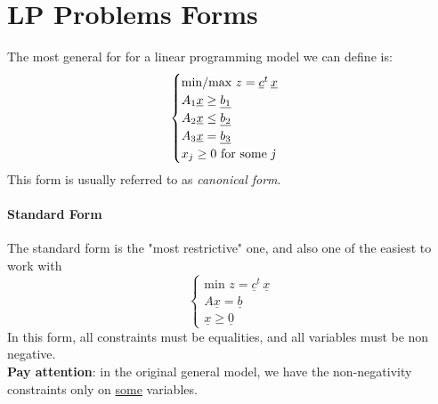     \section{LP Problems Forms}
        The most general for for a linear programming model we can define is:
        \begin{equation}
            \begin{cases}
                \text{min/max } z = \underline{c}^t\, \underline{x}\\
                A_1\underline{x} \geq \underline{b_1}\\
                A_2\underline{x} \leq \underline{b_2}\\
                A_3\underline{x} = \underline{b_3}\\
                x_j \geq 0 \text{ for some \emph{j}}
            \end{cases}
        \end{equation}
        This form is usually referred to as \textit{canonical form}.

        \paragraph{Standard Form}
            The standard form is the "most restrictive" one, and also one of the easiest to work with
            \begin{equation}
                \begin{cases}
                    \text{min } z = \underline{c}^t\, \underline{x}\\
                    A\underline{x} = \underline{b}\\
                    \underline{x} \geq \underline{0} 
                \end{cases}
            \end{equation}
            In this form, all constraints must be equalities, and all variables must be non negative.\\
            \textbf{Pay attention}: in the original general model, we have the non-negativity constraints only on \underline{some} variables.

